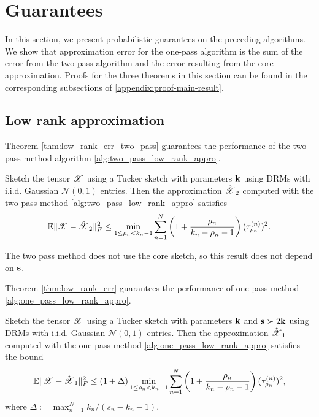 \section{Guarantees}
\label{sec:theory}
In this section, we present probabilistic guarantees on the preceding algorithms.
We show that approximation error for the one-pass algorithm is the sum of
the error from the two-pass algorithm and the error resulting from the core approximation.
Proofs for the three theorems in this section can be found in
the corresponding subsections of \ref{appendix:proof-main-result}.




\subsection{Low rank approximation}
Theorem  \ref{thm:low_rank_err_two_pass} guarantees the performance of the two pass method algorithm \ref{alg:two_pass_low_rank_appro}.
\begin{thm}
	\label{thm:low_rank_err_two_pass}
	Sketch the tensor $\T{X}$ using a Tucker sketch with parameters $\mathbf{k}$
	using DRMs %
	with i.i.d. Gaussian $\mathcal N(0,1)$ entries.
	Then the approximation $\hat{\T{X}}_2$ computed with the two pass method \ref{alg:two_pass_low_rank_appro}
	satisfies
	\begin{equation*}
	\mathbb{E}\| \T{X} - \hat{\T{X}}_2 \|_F^2  \le  \min_{1\le \rho_n<k_n-1}
	\sum_{n=1}^N \left(1+\frac{\rho_n}{k_n-\rho_n-1}\right)(\tau^{(n)}_{\rho_n})^2.
	\end{equation*}
\end{thm}
The two pass method does not use the core sketch, so this result does not depend on $\mathbf{s}$.

Theorem \ref{thm:low_rank_err} guarantees the performance of  one pass method \ref{alg:one_pass_low_rank_appro}.
\begin{thm}
\label{thm:low_rank_err}
Sketch the tensor $\T{X}$ using a Tucker sketch with parameters $\mathbf{k}$ and $\mathbf{s} \succ 2\mathbf{k}$
using DRMs %
with i.i.d. Gaussian $\mathcal N(0,1)$ entries.
Then the approximation $\hat{\T{X}}_1$ computed with the one pass method \ref{alg:one_pass_low_rank_appro}
satisfies the bound
\begin{equation*}
\mathbb{E}\| \T{X} - \hat{\T{X}}_1 \|_F^2  \le (1+\Delta)  \min_{1\le \rho_n<k_n-1}
	\sum_{n=1}^N \left(1+\frac{\rho_n}{k_n-\rho_n-1}\right)(\tau^{(n)}_{\rho_n})^2,
\end{equation*}
where $\Delta := \max_{n=1}^N k_n / (s_n-k_n-1)$.
\end{thm}

